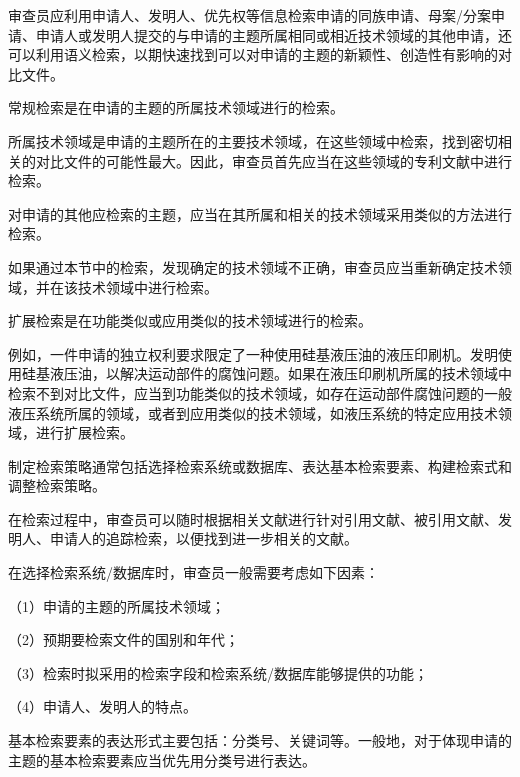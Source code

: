 审查员应利用申请人、发明人、优先权等信息检索申请的同族申请、母案/分案申请、申请人或发明人提交的与申请的主题所属相同或相近技术领域的其他申请，还可以利用语义检索，以期快速找到可以对申请的主题的新颖性、创造性有影响的对比文件。

常规检索是在申请的主题的所属技术领域进行的检索。

所属技术领域是申请的主题所在的主要技术领域，在这些领域中检索，找到密切相关的对比文件的可能性最大。因此，审查员首先应当在这些领域的专利文献中进行检索。

对申请的其他应检索的主题，应当在其所属和相关的技术领域采用类似的方法进行检索。

如果通过本节中的检索，发现确定的技术领域不正确，审查员应当重新确定技术领域，并在该技术领域中进行检索。

扩展检索是在功能类似或应用类似的技术领域进行的检索。

例如，一件申请的独立权利要求限定了一种使用硅基液压油的液压印刷机。发明使用硅基液压油，以解决运动部件的腐蚀问题。如果在液压印刷机所属的技术领域中检索不到对比文件，应当到功能类似的技术领域，如存在运动部件腐蚀问题的一般液压系统所属的领域，或者到应用类似的技术领域，如液压系统的特定应用技术领域，进行扩展检索。

制定检索策略通常包括选择检索系统或数据库、表达基本检索要素、构建检索式和调整检索策略。

在检索过程中，审查员可以随时根据相关文献进行针对引用文献、被引用文献、发明人、申请人的追踪检索，以便找到进一步相关的文献。

在选择检索系统/数据库时，审查员一般需要考虑如下因素：

{\setlength{\parindent}{17.1bp}（1）申请的主题的所属技术领域；\par}

{\setlength{\parindent}{17.1bp}（2）预期要检索文件的国别和年代；\par}

{\setlength{\parindent}{17.1bp}（3）检索时拟采用的检索字段和检索系统/数据库能够提供的功能；\par}

{\setlength{\parindent}{17.1bp}（4）申请人、发明人的特点。\par}

基本检索要素的表达形式主要包括：分类号、关键词等。一般地，对于体现申请的主题的基本检索要素应当优先用分类号进行表达。

